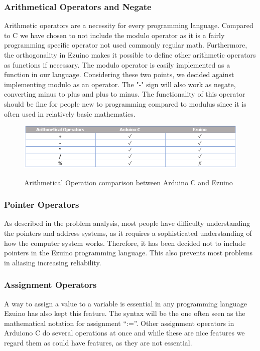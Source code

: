 \subsubsection*{Arithmetical Operators and Negate}
Arithmetic operators are a necessity for every programming language.
Compared to C we have chosen to not include the modulo operator as it is a fairly programming specific operator not used commonly regular math. Furthermore, the orthogonality in Ezuino makes it possible to define other arithmetic operators as functions if necessary. The modulo operator is easily implemented as a function in our language. Considering these two points, we decided against implementing modulo as an operator.
The "-" sign will also work as negate, converting minus to plus and plus to minus. The functionality of this operator should be fine for people new to programming compared to modulus since it is often used in relatively basic mathematics.
\begin{figure}[H]
\centering
\caption{Arithmetical Operation comparison between Arduino C and Ezuino}
\includegraphics[scale=0.80]{figures/language_features/langf05.png}
\label{lf05}
\end{figure}

\subsubsection*{Pointer Operators}
As described in the problem analysis, most people have difficulty understanding the pointers and address systems, as it requires a sophisticated understanding of how the computer system works. Therefore, it has been decided not to include pointers in the Ezuino programming language. This also prevents most problems in aliasing increasing reliability.
\subsubsection*{Assignment Operators}
A way to assign a value to a variable is essential in any programming language Ezuino has also kept this feature. The syntax will be the one often seen as the mathematical notation for assignment “:=”. Other assignment operators in Arduiono C do several operations at once and while these are nice features we regard them as could have features, as they are not essential.
